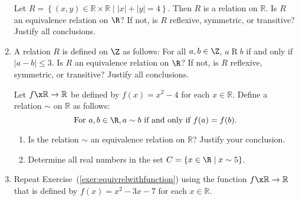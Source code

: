 \begin{enumerate}
\xitem Let  
$R = \left\{ { {\left( {x, y} \right) \in \mathbb{R} \times \mathbb{R} } \mid \left| x \right| + \left| y \right| = 4} \right\}$.  Then  $R$  is a relation on  $\mathbb{R}$. 
\label{exer:sec72-2}
Is $R$ an equivalence relation on $\R$?  If not, is $R$ reflexive, symmetric, or transitive?  Justify all conclusions.

\item A relation $R$ is defined on $\Z$ as follows:  For all $a, b \in \Z$, $a \mathrel{R} b$ if and only if $\left| a - b \right| \leq 3$.  Is $R$ an equivalence relation on $\R$?  If not, is $R$ reflexive, symmetric, or transitive?  Justify all conclusions.
\label{exer:sec72-absvalue}%

%
%
%




\xitem Let  $f\x \mathbb{R} \to \mathbb{R}$ be defined by  $f( x ) = x^2  - 4$
for each  $x \in \mathbb{R}$.  Define a relation  $\sim$  on  $\mathbb{R}$ as follows:
\label{exer:equivrelwithfunction}%
\[
\text{For }  a, b \in \R,  a \sim b \text{ if and only if }  
f( a ) = f( b ).
\]
\begin{enumerate}
  \item Is the relation  $\sim$  an equivalence relation on  $\mathbb{R}$?  Justify your         conclusion.  \label{exer:equivrelwithfunctiona}

  \item Determine all real numbers in the set $C = \left\{ { {x \in \R } \mid x \sim 5} \right\}$.
\end{enumerate}

\item Repeat Exercise~(\ref{exer:equivrelwithfunction}) using the function  
$f\x \mathbb{R} \to \mathbb{R}$ that is defined by 
$f( x ) = x^2  - 3x - 7$ for each  
$x \in \mathbb{R}$.  \label{exer:equivrelwithfunction2}


\end{enumerate}
